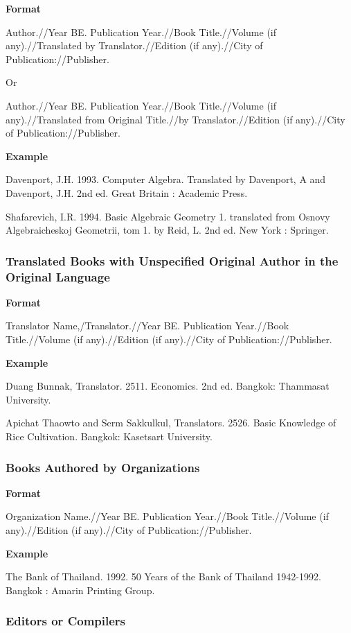 \textbf{Format}

Author.//Year BE. Publication Year.//Book Title.//Volume (if any).//Translated by Translator.//Edition (if any).//City of Publication://Publisher.

Or

Author.//Year BE. Publication Year.//Book Title.//Volume (if any).//Translated from Original Title.//by Translator.//Edition (if any).//City of Publication://Publisher.

\textbf{Example}

Davenport, J.H. 1993. Computer Algebra. Translated by Davenport, A and Davenport, J.H. 2nd ed. Great Britain : Academic Press.

Shafarevich, I.R. 1994. Basic Algebraic Geometry 1. translated from Osnovy Algebraicheskoj Geometrii, tom 1. by Reid, L. 2nd ed. New York : Springer.

\subsubsection{Translated Books with Unspecified Original Author in the Original Language}

\textbf{Format}

Translator Name,/Translator.//Year BE. Publication Year.//Book Title.//Volume (if any).//Edition (if any).//City of Publication://Publisher.

\textbf{Example}

Duang Bunnak, Translator. 2511. Economics. 2nd ed. Bangkok: Thammasat University.

Apichat Thaowto and Serm Sakkulkul, Translators. 2526. Basic Knowledge of Rice Cultivation. Bangkok: Kasetsart University.

\subsubsection{Books Authored by Organizations}

\textbf{Format}

Organization Name.//Year BE. Publication Year.//Book Title.//Volume (if any).//Edition (if any).//City of Publication://Publisher.

\textbf{Example}

The Bank of Thailand. 1992. 50 Years of the Bank of Thailand 1942-1992. Bangkok : Amarin Printing Group.

\subsubsection{Editors or Compilers}

